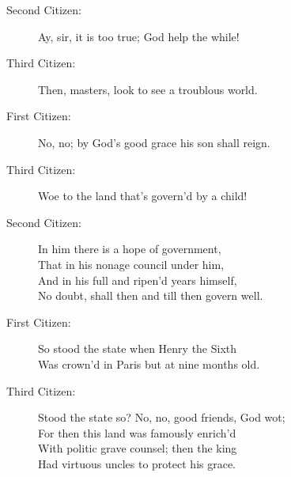 \documentclass{article}
\begin{document}
\begin{description}
\item[Second Citizen:] 
\hspace{1pt}Ay, sir, it is too true; God help the while!\\
\end{description}
\begin{description}
\item[Third Citizen:] 
\hspace{1pt}Then, masters, look to see a troublous world.\\
\end{description}
\begin{description}
\item[First Citizen:] 
\hspace{1pt}No, no; by God's good grace his son shall reign.\\
\end{description}
\begin{description}
\item[Third Citizen:] 
\hspace{1pt}Woe to the land that's govern'd by a child!\\
\end{description}
\begin{description}
\item[Second Citizen:] 
\hspace{1pt}In him there is a hope of government,\\
\hspace{1pt}That in his nonage council under him,\\
\hspace{1pt}And in his full and ripen'd years himself,\\
\hspace{1pt}No doubt, shall then and till then govern well.\\
\end{description}
\begin{description}
\item[First Citizen:] 
\hspace{1pt}So stood the state when Henry the Sixth\\
\hspace{1pt}Was crown'd in Paris but at nine months old.\\
\end{description}
\begin{description}
\item[Third Citizen:] 
\hspace{1pt}Stood the state so? No, no, good friends, God wot;\\
\hspace{1pt}For then this land was famously enrich'd\\
\hspace{1pt}With politic grave counsel; then the king\\
\hspace{1pt}Had virtuous uncles to protect his grace.\\
\end{description}
\end{document}
